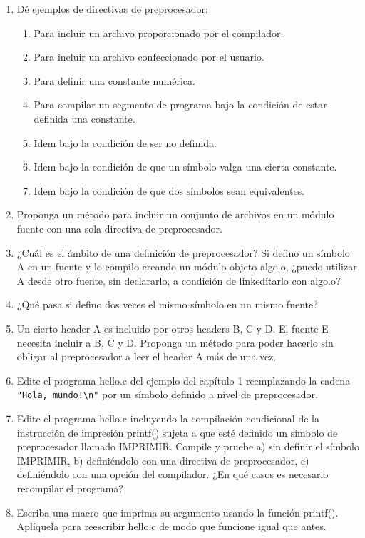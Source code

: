 \begin{enumerate}
	\item Dé ejemplos de directivas de preprocesador:
		\begin{enumerate}[label=\alph*.]
\item Para incluir un archivo proporcionado por el compilador.
\item Para incluir un archivo confeccionado por el usuario.
\item Para definir una constante numérica.
\item Para compilar un segmento de programa bajo la condición de estar definida una constante.
\item Idem bajo la condición de ser no definida.
\item Idem bajo la condición de que un símbolo valga una cierta constante.
\item Idem bajo la condición de que dos símbolos sean equivalentes.
\end{enumerate}
\item Proponga un método para incluir un conjunto de archivos en un módulo fuente con una sola
directiva de preprocesador.
 \item ¿Cuál es el ámbito de una definición de preprocesador? Si defino un símbolo A en un fuente y lo
compilo creando un módulo objeto algo.o, ¿puedo utilizar A desde otro fuente, sin declararlo, a
condición de linkeditarlo con algo.o?
\item ¿Qué pasa si defino dos veces el mismo símbolo en un mismo fuente?
\item Un cierto header A es incluido por otros headers B, C y D. El fuente E necesita incluir a B, C y D.
Proponga un método para poder hacerlo sin obligar al preprocesador a leer el header A más de una
vez.
\item Edite el programa hello.c del ejemplo del capítulo 1 reemplazando la cadena \lstinline{"Hola, mundo!\n"} por
un símbolo definido a nivel de preprocesador.
\item  Edite el programa hello.c incluyendo la compilación condicional de la instrucción de impresión
printf() sujeta a que esté definido un símbolo de preprocesador llamado IMPRIMIR. Compile y pruebe
a) sin definir el símbolo IMPRIMIR, b) definiéndolo con una directiva de preprocesador, c)
definiéndolo con una opción del compilador. ¿En qué casos es necesario recompilar el programa?
\item  Escriba una macro que imprima su argumento usando la función printf(). Aplíquela para reescribir
hello.c de modo que funcione igual que antes.

\end{enumerate}
